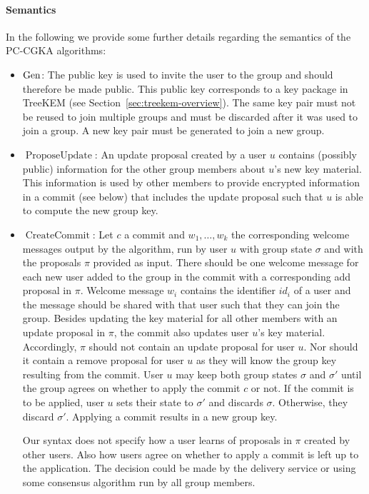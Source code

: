 \paragraph{Semantics} In the following we provide some further details regarding the semantics of the PC-CGKA algorithms:
\begin{itemize}
	\item $\mathrm{Gen}$: The public key is used to invite the user to the group and should therefore be made public. This public key corresponds to a key package in TreeKEM (see Section~\ref{sec:treekem-overview}). The same key pair must not be reused to join multiple groups and must be discarded after it was used to join a group. A new key pair must be generated to join a new group.
	\item $\operatorname{ProposeUpdate}$: An update proposal created by a user $u$ contains (possibly public) information for the other group members about $u$'s new key material. This information is used by other members to provide encrypted information in a commit (see below) that includes the update proposal such that $u$ is able to compute the new group key.
	\item $\operatorname{CreateCommit}$: Let $c$ a commit and $w_1, \ldots, w_k$ the corresponding welcome messages output by the algorithm, run by user $u$ with group state $\sigma$ and with the proposals $\pi$ provided as input. There should be one welcome message for each new user added to the group in the commit with a corresponding add proposal in $\pi$. Welcome message $w_i$ contains the identifier $id_i$ of a user and the message should be shared with that user such that they can join the group. Besides updating the key material for all other members with an update proposal in $\pi$, the commit also updates user $u$'s key material. Accordingly, $\pi$ should not contain an update proposal for user $u$. Nor should it contain a remove proposal for user $u$ as they will know the group key resulting from the commit. User $u$ may keep both group states $\sigma$ and $\sigma'$ until the group agrees on whether to apply the commit $c$ or not. If the commit is to be applied, user $u$ sets their state to $\sigma'$ and discards $\sigma$. Otherwise, they discard $\sigma'$. Applying a commit results in a new group key.

	      Our syntax does not specify how a user learns of proposals in $\pi$ created by other users. Also how users agree on whether to apply a commit is left up to the application. The decision could be made by the delivery service or using some consensus algorithm run by all group members.


\end{itemize}
